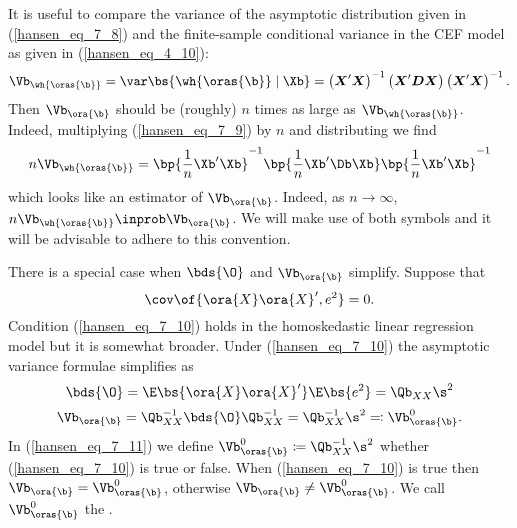 It is useful to compare the variance of the asymptotic distribution given in (\ref{hansen_eq_7_8}) and the finite-sample conditional variance in the CEF model as given in (\ref{hansen_eq_4_10}):
\begin{equation}
    \label{hansen_eq_7_9}
    \Vb_{\wh{\oras{\b}}} = \var\bs{\wh{\oras{\b}} \mid \Xb} = \left(\boldsymbol{X}^{\prime} \boldsymbol{X}\right)^{-1}\left(\boldsymbol{X}^{\prime} \boldsymbol{D} \boldsymbol{X}\right)\left(\boldsymbol{X}^{\prime} \boldsymbol{X}\right)^{-1}.
\end{equation}
 Then $\Vb_{\ora{\b}}$ should be (roughly) $n$ times as large as $\Vb_{\wh{\oras{\b}}}$. Indeed, multiplying (\ref{hansen_eq_7_9}) by $n$ and distributing we find
\begin{equation}
    \notag
    n \Vb_{\wh{\oras{\b}}} = \bp{\frac{1}{n} \Xb^\prime \Xb}^{-1} \bp{\frac{1}{n} \Xb^\prime \Db \Xb} \bp{\frac{1}{n} \Xb^\prime \Xb}^{-1}
\end{equation}
which looks like an estimator of $\Vb_{\ora{\b}}$. Indeed, as $n \rightarrow \infty$, $n \Vb_{\wh{\oras{\b}}} \inprob \Vb_{\ora{\b}}$.  We will make use of both symbols and it will be advisable to adhere to this convention.

There is a special case when $\bds{\O}$ and $\Vb_{\ora{\b}}$ simplify. Suppose that 
\begin{equation}
    \label{hansen_eq_7_10}
    \cov\of{\ora{X}\ora{X}^\prime, e^2} = 0.
\end{equation}
Condition (\ref{hansen_eq_7_10}) holds in the homoskedastic linear regression model but it is somewhat broader. Under (\ref{hansen_eq_7_10}) the asymptotic variance formulae simplifies as 
\begin{equation}
    \notag
    \bds{\O} = \E\bs{\ora{X}\ora{X}^\prime} \E\bs{e^2} = \Qb_{XX}\s^2
\end{equation}
\begin{equation}
    \label{hansen_eq_7_11}
    \Vb_{\ora{\b}} = \Qb_{XX}^{-1} \bds{\O} \Qb_{XX}^{-1} = \Qb_{XX}^{-1} \s^2 \eqqcolon \Vb_{\oras{\b}}^0.
\end{equation}
In (\ref{hansen_eq_7_11}) we define $\Vb_{\oras{\b}}^0 \coloneqq \Qb_{XX}^{-1} \s^2$ whether (\ref{hansen_eq_7_10}) is true or false. When (\ref{hansen_eq_7_10}) is true then $\Vb_{\ora{\b}} = \Vb_{\oras{\b}}^0$, otherwise $\Vb_{\ora{\b}} \neq \Vb_{\oras{\b}}^0$. We call $\Vb_{\oras{\b}}^0$ the .

